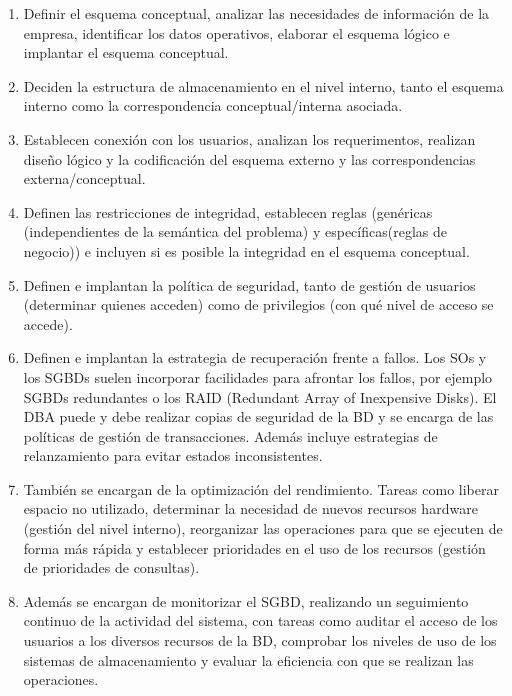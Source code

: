 \documentclass[a4paper,11pt]{article}
\begin{document}
\begin{enumerate}
\item Definir el esquema conceptual, analizar las necesidades de información de la empresa, identificar los datos operativos, elaborar el esquema lógico e implantar el esquema conceptual.

\item Deciden la estructura de almacenamiento en el nivel interno, tanto el esquema interno como la correspondencia conceptual/interna asociada.

\item Establecen conexión con los usuarios, analizan los requerimentos, realizan diseño lógico y la codificación del esquema externo y las correspondencias externa/conceptual.

\item Definen las restricciones de integridad, establecen reglas (genéricas (independientes de la semántica del problema) y específicas(reglas de negocio)) e incluyen si es posible la integridad en el esquema conceptual.

\item Definen e implantan la política de seguridad, tanto de gestión de usuarios (determinar quienes acceden) como de privilegios (con qué nivel de acceso se accede).

\item Definen e implantan la estrategia de recuperación frente a fallos. Los SOs y los SGBDs suelen incorporar facilidades para afrontar los fallos, por ejemplo SGBDs redundantes o los RAID (Redundant Array of Inexpensive Disks). El DBA puede y debe realizar copias de seguridad de la BD y se encarga de las políticas de gestión de transacciones. Además incluye estrategias de relanzamiento para evitar estados inconsistentes.

\item También se encargan de la optimización del rendimiento. Tareas como liberar espacio no utilizado, determinar la necesidad de nuevos recursos hardware (gestión del nivel interno), reorganizar las operaciones para que se ejecuten de forma más rápida y establecer prioridades en el uso de los recursos (gestión de prioridades de consultas).

\item Además se encargan de monitorizar el SGBD, realizando un seguimiento continuo de la actividad del sistema, con tareas como auditar el acceso de los usuarios a los diversos recursos de la BD, comprobar los niveles de uso de los sistemas de almacenamiento y evaluar la eficiencia con que se realizan las operaciones.
\end{enumerate}
\end{document}
